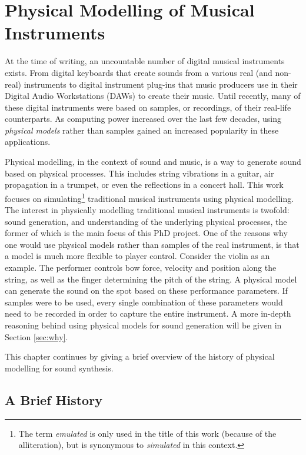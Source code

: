 \chapter{Physical Modelling of Musical Instruments}\label{ch:physMod}
At the time of writing, an uncountable number of digital musical instruments exists. From digital keyboards that create sounds from a various real (and non-real) instruments to digital instrument plug-ins that music producers use in their Digital Audio Workstations (DAWs) to create their music. Until recently, many of these digital instruments were based on samples, or recordings, of their real-life counterparts. As computing power increased over the last few decades, using \textit{physical models} rather than samples gained an increased popularity in these applications.

Physical modelling, in the context of sound and music, is a way to generate sound based on physical processes. This includes string vibrations in a guitar, air propagation in a trumpet, or even the reflections in a concert hall. This work focuses on simulating\footnote{The term \textit{emulated} is only used in the title of this work (because of the alliteration), but is synonymous to \textit{simulated} in this context.} traditional musical instruments using physical modelling. 
The interest in physically modelling traditional musical instruments is twofold: sound generation, and understanding of the underlying physical processes, the former of which is the main focus of this PhD project. One of the reasons why one would use physical models rather than samples of the real instrument, is that a model is much more flexible to player control. Consider the violin as an example. The performer controls bow force, velocity and position along the string, as well as the finger determining the pitch of the string. A physical model can generate the sound on the spot based on these performance parameters. If samples were to be used, every single combination of these parameters would need to be recorded in order to capture the entire instrument.
A more in-depth reasoning behind using physical models for sound generation will be given in Section \ref{sec:why}.

This chapter continues by giving a brief overview of the history of physical modelling for sound synthesis.

\section{A Brief History}\label{sec:history}

